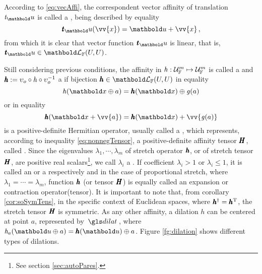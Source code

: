 According to \eqref{eq:vecAffi}, the correspondent vector affinity of translation $\mathit{t}_\vto{u}$ is called a , being described by equality
\begin{equation}\label{eq:transltVec}
\fua{\tnr{\mathit{t}}_\vto{u}}{\vv{x}}=\vto{u} + \vv{x}\,,
\end{equation}
from which it is clear that vector function $\tnr{\mathit{t}}_\vto{u}$ is linear, that is, $\tnr{\mathit{t}}_\vto{u}\in\evl{\cam{F}}{U}{U}$.

Still considering previous conditions, the affinity in $\map{\mathit{h}}{\eamd{U}{F}{m}}{\eamd{U}{F}{m}}$ is called a  and $\tnr{\mathit{h}}:= \upsilon_o\circ\mathit{h}\circ\upsilon_o^{-1}$ a  if bijection $\vtf{h}\in\evl{\cam{F}}{U}{U}$ in equality
\begin{equation}\label{eq:dilat}
\fua{\mathit{h}}{\vto{x}\oplus a}=\fua{\vtf{h}}{\vto{x}}\oplus\fua{\mathit{g}}{a}
\end{equation}
or in equality
\begin{equation}\label{eq:dilatVec}
\fua{\tnr{\mathit{h}}}{\vto{x}+ \vv{a}}=\fua{\vtf{h}}{\vto{x}}+\vv{\fua{\mathit{g}}{a}}
\end{equation}
is a positive-definite Hermitian operator, usually called a , which represents, according to inequality \eqref{eq:nonnegTensor}, a positive-definite affinity tensor $\tnr{H}$, called . Since the eigenvalues $\lambda_1,\cdots,\lambda_m$ of stretch operator $\vtf{h}$, or of stretch tensor $\tnr{H}$, are positive real scalars\footnote{See section \ref{sec:autoPares}.}, we call $\lambda_i$ a . If coefficient $\lambda_i>1$ or $\lambda_i\leqslant1$, it is called an  or a  respectively and in the case of proportional stretch, where $\lambda_1=\cdots=\lambda_m$, function $\vtf{h}$ (or tensor $\tnr{H}$) is equally called an expansion or contraction operator(tensor). It is important to note that, from corollary \ref{cor:soSymTens}, in the specific context of Euclidean spaces, where $\vtf{h}^\dagger=\vtf{h}^\text{T}$, the stretch tensor $\tnr{H}$ is symmetric. As any other affinity, a dilation $\mathit{h}$ can be centered at point $a$, represented by $\gloref{dilat}$, where $\fua{\mathit{h}_a}{\vto{u}\oplus a}=\fua{\vtf{h}}{\vto{u}}\oplus a$. Figure \ref{fg:dilation} shows different types of dilations.
